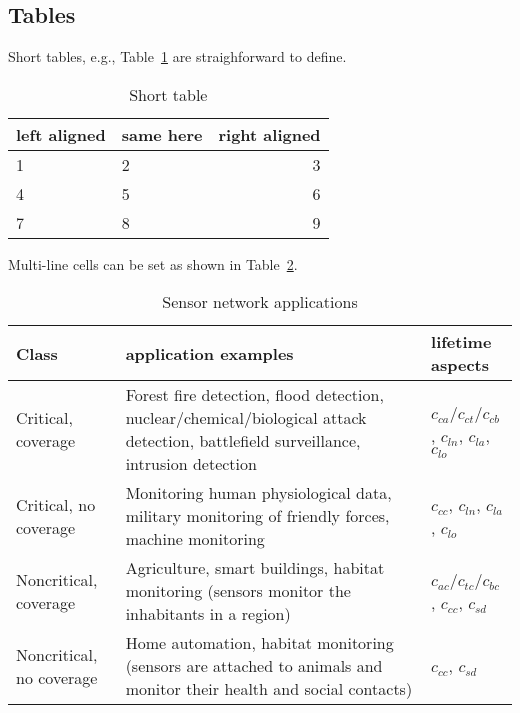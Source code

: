 \subsection{Tables}

Short tables, e.g., Table~\ref{tab:shorttable} are straighforward to define.

\begin{table}
    \centering
    \begin{tabular}{llr}
        \toprule
        left aligned & same here & right aligned \\
        \midrule
        1 & 2 & 3 \\
        4 & 5 & 6 \\
        7 & 8 & 9 \\
        \bottomrule
    \end{tabular}
    \caption{Short table}
    \label{tab:shorttable}
\end{table}

Multi-line cells can be set as shown in Table~\ref{tab:SensorNetworkApplications}.

\begin{table}
    \centering
    \begin{tabular}{>{\raggedright}p{1.8cm}p{5.4cm}p{3.4cm}}
        \toprule
        Class & application examples & lifetime aspects \\
        \midrule
        Critical, coverage &
                Forest fire detection, flood detection, nuclear/chemical/biological attack detection, battlefield surveillance, intrusion detection &
                $c_{ca}$/$c_{ct}$/$c_{cb}$, $c_{ln}$, $c_{la}$, $c_{lo}$\\
        Critical, no coverage &
                Monitoring human physiological data, military monitoring of friendly forces, machine monitoring &
                $c_{cc}$, $c_{ln}$, $c_{la}$, $c_{lo}$ \\
        Noncritical, coverage &
                Agriculture, smart buildings, habitat monitoring (sensors monitor the inhabitants in a region) &
                $c_{ac}$/$c_{tc}$/$c_{bc}$, $c_{cc}$, $c_{sd}$ \\
        Noncritical, no coverage &
                Home automation, habitat monitoring (sensors are attached to animals and monitor their health and social contacts) &
                $c_{cc}$, $c_{sd}$ \\
        \bottomrule
    \end{tabular}
    \caption{Sensor network applications}
    \label{tab:SensorNetworkApplications}
\end{table}


